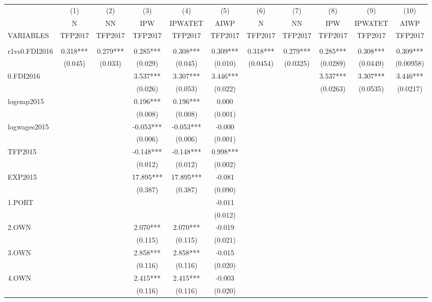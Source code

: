 \documentclass[]{article}
\begin{document}
\begin{tabular}{lcccccccccc} \hline
 & (1) & (2) & (3) & (4) & (5) & (6) & (7) & (8) & (9) & (10) \\
 & N & NN & IPW & IPWATET & AIWP & N & NN & IPW & IPWATET & AIWP \\
VARIABLES & TFP2017 & TFP2017 & TFP2017 & TFP2017 & TFP2017 & TFP2017 & TFP2017 & TFP2017 & TFP2017 & TFP2017 \\ \hline
 &  &  &  &  &  &  &  &  &  &  \\
r1vs0.FDI2016 & 0.318*** & 0.279*** & 0.285*** & 0.308*** & 0.309*** & 0.318*** & 0.279*** & 0.285*** & 0.308*** & 0.309*** \\
 & (0.045) & (0.033) & (0.029) & (0.045) & (0.010) & (0.0454) & (0.0325) & (0.0289) & (0.0449) & (0.00958) \\
0.FDI2016 &  &  & 3.537*** & 3.307*** & 3.446*** &  &  & 3.537*** & 3.307*** & 3.446*** \\
 &  &  & (0.026) & (0.053) & (0.022) &  &  & (0.0263) & (0.0535) & (0.0217) \\
logemp2015 &  &  & 0.196*** & 0.196*** & 0.000 &  &  &  &  &  \\
 &  &  & (0.008) & (0.008) & (0.001) &  &  &  &  &  \\
logwages2015 &  &  & -0.053*** & -0.053*** & -0.000 &  &  &  &  &  \\
 &  &  & (0.006) & (0.006) & (0.001) &  &  &  &  &  \\
TFP2015 &  &  & -0.148*** & -0.148*** & 0.998*** &  &  &  &  &  \\
 &  &  & (0.012) & (0.012) & (0.002) &  &  &  &  &  \\
EXP2015 &  &  & 17.895*** & 17.895*** & -0.081 &  &  &  &  &  \\
 &  &  & (0.387) & (0.387) & (0.090) &  &  &  &  &  \\
1.PORT &  &  &  &  & -0.011 &  &  &  &  &  \\
 &  &  &  &  & (0.012) &  &  &  &  &  \\
2.OWN &  &  & 2.070*** & 2.070*** & -0.019 &  &  &  &  &  \\
 &  &  & (0.115) & (0.115) & (0.021) &  &  &  &  &  \\
3.OWN &  &  & 2.858*** & 2.858*** & -0.015 &  &  &  &  &  \\
 &  &  & (0.116) & (0.116) & (0.020) &  &  &  &  &  \\
4.OWN &  &  & 2.415*** & 2.415*** & -0.003 &  &  &  &  &  \\
 &  &  & (0.116) & (0.116) & (0.020) &  &  &  &  &  \\

\end{tabular}
\end{document}
